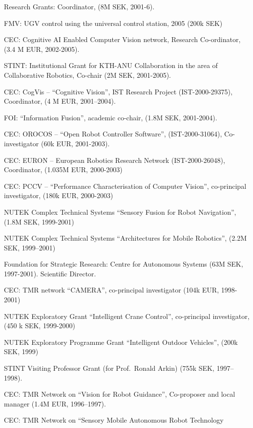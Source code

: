 \documentclass{article}
\begin{document}
\begin{cv}
\begin{cvlist}{Research Grants:}
  Coordinator, (8M SEK, 2001-6). %
\item FMV: UGV control using the universal control station, 2005 (200k
  SEK) %
\item CEC: Cognitive AI Enabled Computer Vision network, Research
  Co-ordinator, (3.4 M EUR, 2002-2005). %
\item STINT: Institutional Grant for KTH-ANU Collaboration in the area
  of Collaborative Robotics, Co-chair (2M SEK, 2001-2005).%
\item CEC: CogVis -- ``Cognitive Vision'', IST Research Project
  (IST-2000-29375), Coordinator, (4 M EUR, 2001--2004).%
\item FOI: ``Information Fusion'', academic co-chair,  (1.8M SEK, 2001-2004).%
\item CEC: OROCOS -- ``Open Robot Controller Software'',
  (IST-2000-31064), Co-investigator (60k EUR, 2001-2003).%
\item CEC: EURON -- European Robotics Research Network
  (IST-2000-26048), Coordinator, (1.035M EUR, 2000-2003)%
\item CEC: PCCV -- ``Performance Characterisation of Computer
  Vision'',  co-principal investigator, (180k EUR, 2000-2003)%
\item NUTEK Complex Technical Systems ``Sensory Fusion for Robot
  Navigation'', (1.8M SEK, 1999-2001)%
\item NUTEK Complex Technical Systems ``Architectures for Mobile
  Robotics'', (2.2M SEK, 1999--2001)%
\item Foundation for Strategic Research: Centre for Autonomous Systems
  (63M SEK, 1997-2001). Scientific Director.%
\item CEC: TMR network ``CAMERA'', co-principal investigator  (104k
  EUR, 1998-2001)%
\item NUTEK Exploratory Grant ``Intelligent Crane Control'',
  co-principal investigator, (450 k SEK, 1999-2000)%
\item NUTEK Exploratory Programme Grant ``Intelligent Outdoor
  Vehicles'', (200k SEK, 1999)%
\item STINT Visiting Professor Grant (for Prof.\ Ronald Arkin)  (755k
  SEK, 1997--1998).%
\item CEC: TMR Network on ``Vision for Robot Guidance'', Co-proposer
  and local manager (1.4M EUR, 1996--1997).%
\item CEC: TMR Network on ``Sensory Mobile Autonomous Robot Technology

\end{cvlist}
\end{cv}
\end{document}
